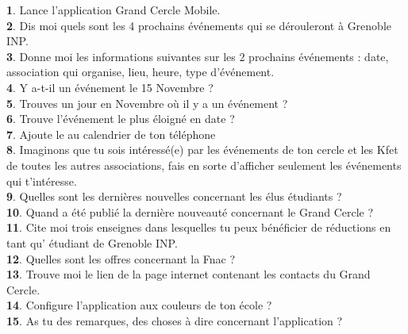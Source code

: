 \documentclass[a4paper, 11px]{article}
\begin{document}
\textbf{1}. Lance l’application Grand Cercle Mobile.	
\\

\textbf{2}. Dis moi quels sont les 4 prochains événements qui se dérouleront  à Grenoble INP.	
\\

\textbf{3}. Donne moi les informations suivantes sur les 2 prochains événements : date, association qui organise, lieu, heure, type d’événement.
  \\

\textbf{4}. Y a-t-il un événement le 15 Novembre ?
  \\

\textbf{5}. Trouves un jour en Novembre où il y a un événement ?	
  \\

\textbf{6}. Trouve l’événement le plus éloigné en date ?	
  \\

\textbf{7}. Ajoute le au calendrier de ton téléphone	
\\

\textbf{8}. Imaginons que tu sois intéressé(e) par les événements de ton cercle et les Kfet de toutes les autres associations, fais en sorte d’afficher seulement les événements qui t’intéresse.
\\

\textbf{9}. Quelles sont les dernières nouvelles concernant les élus étudiants ?	
  \\

\textbf{10}.  Quand a été publié la dernière nouveauté concernant le Grand Cercle ?	
\\

\textbf{11}.  Cite moi trois enseignes dans lesquelles tu peux bénéficier de réductions en tant qu' étudiant de Grenoble INP.
  \\

\textbf{12}. Quelles sont les offres concernant la Fnac ?	
\\

\textbf{13}.  Trouve moi le lien de la page internet contenant les contacts du Grand Cercle.	
  \\

\textbf{14}.  Configure l’application aux couleurs de ton école ?	
\\

\textbf{15}. As tu des remarques, des choses à dire concernant l’application ?	
  
\end{document}
